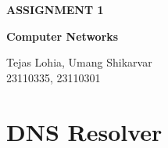 \documentclass[12pt, a4paper]{report}
\begin{document}
\begin{titlepage}
    \centering
    \vspace*{\fill} %
    
    {\Huge\bfseries ASSIGNMENT 1}
    
    \vspace{0.75cm} %
    
    {\Large\bfseries Computer Networks}
    
    \vfill %
    
    \colorbox{customOrange}{%
        \parbox{1.0\textwidth}{%
            \centering
            \vspace{1em} %
            {\Large\color{white} Tejas Lohia, Umang Shikarvar} \\[0.5em] %
            {\large\color{white} 23110335, 23110301} %
            \vspace{1em} %
        }
    }
    
    \vspace*{\fill} %
\end{titlepage}




\renewcommand{\cfttoctitlefont}{\hfill} 
\renewcommand{\cftaftertoctitle}{\hfill}
{}

\tableofcontents 

\chapter{DNS Resolver}
\end{document}
